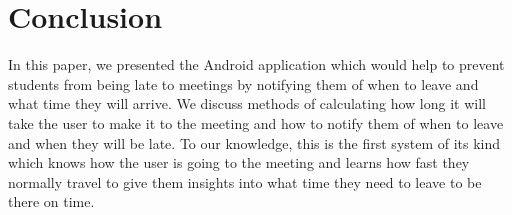 \section{Conclusion}
In this paper, we presented the  Android application which would help to prevent students from being late to meetings by notifying them of when to leave and what time they will arrive. We discuss methods of calculating how long it will take the user to make it to the meeting and how to notify them of when to leave and when they will be late. To our knowledge, this is the first system of its kind which knows how the user is going to the meeting and learns how fast they normally travel to give them insights into what time they need to leave to be there on time.